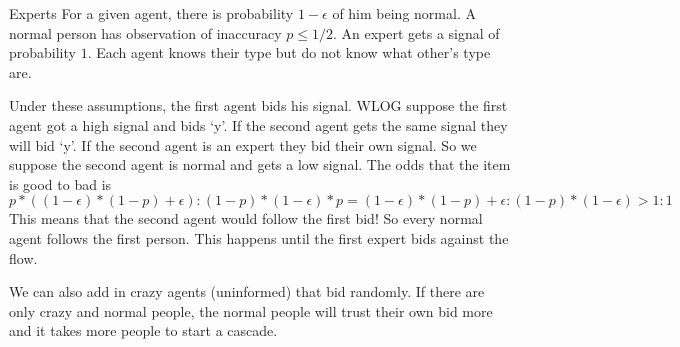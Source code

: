 \begin{aexample}{Experts}{}
    For a given agent, there is probability $1-\epsilon$ of him being normal. A normal person has observation of inaccuracy $p\leq 1/2$. An expert gets a signal of probability $1$. Each agent knows their type but do not know what other's type are.
\end{aexample}

Under these assumptions, the first agent bids his signal. 
WLOG suppose the first agent got a high signal and bids `y'. If the second agent gets the same signal they will bid `y'. If the second agent is an expert they bid their own signal. So we suppose the second agent is normal and gets a low signal.
The odds that the item is good to bad is \[
    p*((1-\epsilon)*(1-p)+ \epsilon) : (1-p) *(1-\epsilon)*p = (1-\epsilon)*(1-p)+ \epsilon : (1-p)*(1-\epsilon) > 1:1
\]
This means that the second agent would follow the first bid! So every normal agent follows the first person. This happens until the first expert bids against the flow.

We can also add in crazy agents (uninformed) that bid randomly. If there are only crazy and normal people, the normal people will trust their own bid more and it takes more people to start a cascade.